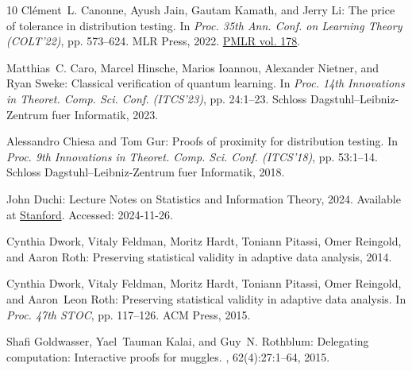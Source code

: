 \begin{thebibliography}{10}
{\sc Cl{\'{e}}ment~L. Canonne, Ayush Jain, Gautam Kamath, and Jerry Li}: The
  price of tolerance in distribution testing.
\newblock In {\em Proc. 35th Ann. Conf. on Learning Theory (COLT'22)}, pp.
  573--624. MLR Press, 2022.
\newblock \href{https://proceedings.mlr.press/v178/canonne22a.html}{PMLR vol.
  178}.

{\sc Matthias~C. Caro, Marcel Hinsche, Marios Ioannou, Alexander Nietner, and
  Ryan Sweke}: Classical verification of quantum learning.
\newblock In {\em Proc. 14th Innovations in Theoret. Comp. Sci. Conf.
  (ITCS'23)}, pp. 24:1--23. Schloss Dagstuhl--Leibniz-Zentrum fuer Informatik,
  2023.

{\sc Alessandro Chiesa and Tom Gur}: Proofs of proximity for distribution
  testing.
\newblock In {\em Proc. 9th Innovations in Theoret. Comp. Sci. Conf.
  (ITCS'18)}, pp. 53:1--14. Schloss Dagstuhl--Leibniz-Zentrum fuer Informatik,
  2018.

{\sc John Duchi}: Lecture {N}otes on {S}tatistics and {I}nformation {T}heory,
  2024.
\newblock Available at
  \href{https://web.stanford.edu/class/stats311/lecture-notes.pdf}{Stanford}.
  Accessed: 2024-11-26.

{\sc Cynthia Dwork, Vitaly Feldman, Moritz Hardt, Toniann Pitassi, Omer
  Reingold, and Aaron Roth}: Preserving statistical validity in adaptive data
  analysis, 2014.

{\sc Cynthia Dwork, Vitaly Feldman, Moritz Hardt, Toniann Pitassi, Omer
  Reingold, and Aaron~Leon Roth}: Preserving statistical validity in adaptive
  data analysis.
\newblock In {\em Proc. 47th STOC}, pp. 117--126. ACM Press, 2015.
\newblock [\epfmtdoi{10.1145/2746539.2746580}]

{\sc Shafi Goldwasser, Yael~Tauman Kalai, and Guy~N. Rothblum}: Delegating
  computation: {I}nteractive proofs for muggles.
, 62(4):27:1--64, 2015.
\newblock [\epfmtdoi{10.1145/2699436}]


\end{thebibliography}

